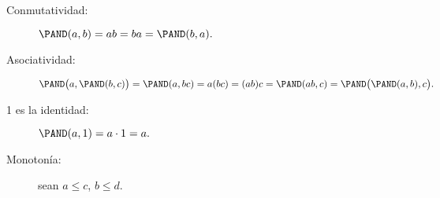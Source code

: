 %
\begin{description}
  \item[Conmutatividad:]
    \(
      \PAND(a, b) =
      ab =
      ba =
      \PAND(b, a).
    \)
  \item[Asociatividad:]
    \(
      \PAND\bigl(a, \PAND(b, c)\bigr) =
      \PAND(a, bc) =
      a(bc) =
      (ab)c =
      \PAND(ab, c) =
      \PAND\bigl(\PAND(a, b), c\bigr).
    \)
  \item[1 es la identidad:]
    \(
      \PAND(a, 1) = a\cdot 1 = a.
    \)
  \item[Monotonía:] sean \(a ≤ c\), \(b ≤ d\).

\end{description}

